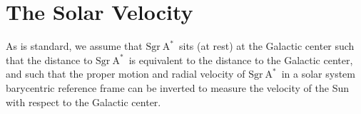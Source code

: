 \documentclass[RNAAS]{aastex631}
\newcommand{\sgrA}{\ensuremath{\textrm{Sgr}~\textrm{A}^{*}}}
\begin{document}
\section{The Solar Velocity} \label{sec:vel}

As is standard, we assume that \sgrA\ sits (at rest) at the Galactic center such
that the distance to \sgrA\ is equivalent to the distance to the Galactic
center, and such that the proper motion and radial velocity of \sgrA\ in a solar
system barycentric reference frame can be inverted to measure the velocity of
the Sun with respect to the Galactic center.





\end{document}
